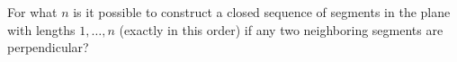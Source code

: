 For what $n$ is it possible to construct a closed sequence of segments in the plane with lengths $1, \ldots, n$ (exactly in this order) if any two neighboring segments are perpendicular?

